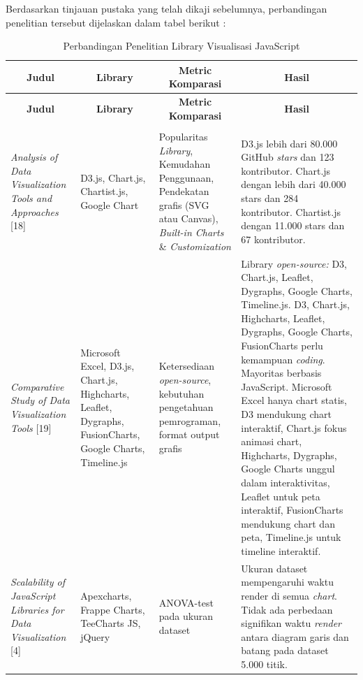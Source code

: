 Berdasarkan tinjauan pustaka yang telah dikaji sebelumnya, perbandingan penelitian tersebut dijelaskan dalam tabel berikut :
\begin{longtable}{|p{2.5cm}|p{2.3cm}|p{3cm}|p{4.5cm}|}
	\caption{Perbandingan Penelitian Library Visualisasi JavaScript}
	\label{tab:comparison_library} \\
	\hline
	\multicolumn{1}{|c|}{\textbf{Judul}} & 
	\multicolumn{1}{c|}{\textbf{Library}} & 
	\multicolumn{1}{c|}{\textbf{Metric Komparasi}} & 
	\multicolumn{1}{c|}{\textbf{Hasil}} \\ \hline
	\endfirsthead
	\hline
	\multicolumn{1}{|c|}{\textbf{Judul}} & 
	\multicolumn{1}{c|}{\textbf{Library}} & 
\multicolumn{1}{c|}{\textbf{Metric Komparasi}} & 
\multicolumn{1}{c|}{\textbf{Hasil}} \\ \hline	
	\endhead
	
	\hline \multicolumn{4}{r}{ } \\ 
	\endfoot
	\endlastfoot
	
	\textit{Analysis of Data Visualization Tools and Approaches} [18] 
	& D3.js, Chart.js, Chartist.js, Google Chart 
	& Popularitas \textit{Library}, Kemudahan Penggunaan, Pendekatan grafis (SVG atau Canvas), \textit{Built-in Charts }\& \textit{Customization} 
	& D3.js lebih dari 80.000 GitHub \textit{stars} dan 123 kontributor. Chart.js dengan lebih dari 40.000 stars dan 284 kontributor. Chartist.js dengan 11.000 stars dan 67 kontributor. \\
	\hline
	
	\textit{Comparative Study of Data Visualization Tools} [19] 
	& Microsoft Excel, D3.js, Chart.js, Highcharts, Leaflet, Dygraphs, FusionCharts, Google Charts, Timeline.js 
	& Ketersediaan \textit{open-source}, kebutuhan pengetahuan pemrograman, format output grafis 
	& Library \textit{open-source:} D3, Chart.js, Leaflet, Dygraphs, Google Charts, Timeline.js. D3, Chart.js, Highcharts, Leaflet, Dygraphs, Google Charts, FusionCharts perlu kemampuan \textit{coding}. Mayoritas berbasis JavaScript. Microsoft Excel hanya chart statis, D3 mendukung chart interaktif, Chart.js fokus animasi chart, Highcharts, Dygraphs, Google Charts unggul dalam interaktivitas, Leaflet untuk peta interaktif, FusionCharts mendukung chart dan peta, Timeline.js untuk timeline interaktif. \\
	\hline
	
	\textit{Scalability of JavaScript Libraries for Data Visualization} [4] 
	& Apexcharts, Frappe Charts, TeeCharts JS, jQuery 
	& ANOVA-test pada ukuran dataset 
	& Ukuran dataset mempengaruhi waktu render di semua \textit{chart}. Tidak ada perbedaan signifikan waktu \textit{render} antara diagram garis dan batang pada dataset 5.000 titik. \\
	\hline
	

\end{longtable}
